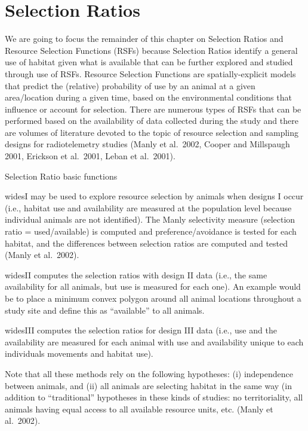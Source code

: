 \documentclass[
  letterpaper,
]{book}
\begin{document}
\newpage

\hypertarget{selection-ratios}{%
\chapter{Selection Ratios}\label{selection-ratios}}

We are going to focus the remainder of this chapter on Selection Ratios
and Resource Selection Functions (RSFs) because Selection Ratios
identify a general use of habitat given what is available that can be
further explored and studied through use of RSFs. Resource Selection
Functions are spatially-explicit models that predict the (relative)
probability of use by an animal at a given area/location during a given
time, based on the environmental conditions that influence or account
for selection. There are numerous types of RSFs that can be performed
based on the availability of data collected during the study and there
are volumes of literature devoted to the topic of resource selection and
sampling designs for radiotelemetry studies (Manly et al.~2002, Cooper
and Millspaugh 2001, Erickson et al.~2001, Leban et al.~2001).

Selection Ratio basic functions

widesI may be used to explore resource selection by animals when designs
I occur (i.e., habitat use and availability are measured at the
population level because individual animals are not identified). The
Manly selectivity measure (selection ratio = used/available) is computed
and preference/avoidance is tested for each habitat, and the differences
between selection ratios are computed and tested (Manly et al.~2002).

widesII computes the selection ratios with design II data (i.e., the
same availability for all animals, but use is measured for each one). An
example would be to place a minimum convex polygon around all animal
locations throughout a study site and define this as ``available'' to
all animals.

widesIII computes the selection ratios for design III data (i.e., use
and the availability are measured for each animal with use and
availability unique to each individuals movements and habitat use).

Note that all these methods rely on the following hypotheses: (i)
independence between animals, and (ii) all animals are selecting habitat
in the same way (in addition to ``traditional'' hypotheses in these
kinds of studies: no territoriality, all animals having equal access to
all available resource units, etc. (Manly et al.~2002).
\end{document}
